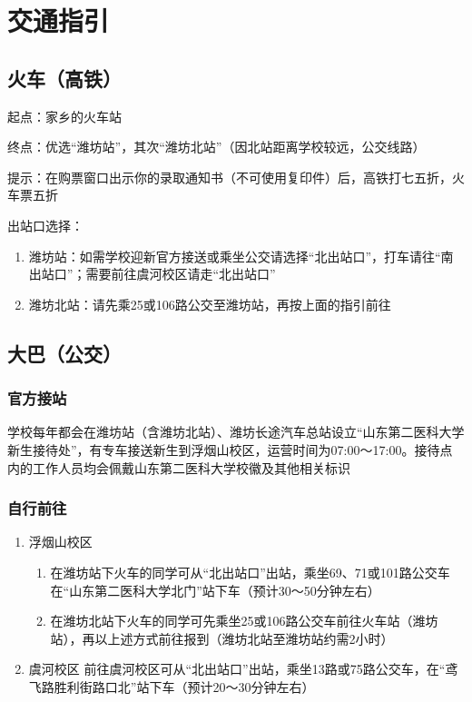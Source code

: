 
\section[交通指引]{交通指引}
\label{goto_school}
\subsection[火车（高铁）]{火车（高铁）}
起点：家乡的火车站

终点：优选“潍坊站”，其次“潍坊北站”（因北站距离学校较远，公交线路）

提示：在购票窗口出示你的录取通知书（不可使用复印件）后，高铁打七五折，火车票五折

出站口选择：
\begin{enumerate}
    \item 潍坊站：如需学校迎新官方接送或乘坐公交请选择“北出站口”，打车请往“南出站口”；需要前往虞河校区请走“北出站口”
    \item 潍坊北站：请先乘25或106路公交至潍坊站，再按上面的指引前往
\end{enumerate}

\subsection[大巴（公交）]{大巴（公交）}

\subsubsection[官方接站]{官方接站}
学校每年都会在潍坊站（含潍坊北站）、潍坊长途汽车总站设立“山东第二医科大学新生接待处”，有专车接送新生到浮烟山校区，运营时间为07:00～17:00。接待点内的工作人员均会佩戴山东第二医科大学校徽及其他相关标识

\subsubsection[自行前往]{自行前往}
\label{bus}
\begin{enumerate}
    \item 浮烟山校区
          \begin{enumerate}
              \item 在潍坊站下火车的同学可从“北出站口”出站，乘坐69、71或101路公交车在“山东第二医科大学北门”站下车（预计30～50分钟左右）
              \item 在潍坊北站下火车的同学可先乘坐25或106路公交车前往火车站（潍坊站），再以上述方式前往报到（潍坊北站至潍坊站约需2小时）
          \end{enumerate}
    \item 虞河校区
          前往虞河校区可从“北出站口”出站，乘坐13路或75路公交车，在“鸢飞路胜利街路口北”站下车（预计20～30分钟左右）
\end{enumerate}

